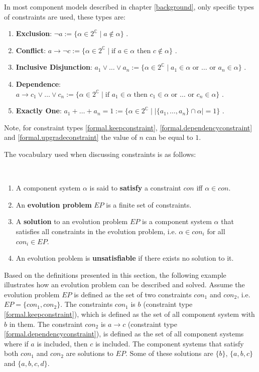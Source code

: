In most component models described in chapter \ref{background}, only specific types of constraints are used, these types are:
\begin{enumerate}
  \label{formal.constrainttypes}
  \item \textbf{Exclusion}: $\neg a := \{\alpha \in 2^{\mathbb{C}} \mid a \not \in \alpha \}$ \label{formal.removeconstraint}.
  \item \textbf{Conflict}: $a \rightarrow \neg c := \{\alpha \in 2^{\mathbb{C}} \mid \mbox{if } a \in \alpha \mbox{ then } c \not \in \alpha\}$ \label{formal.conflictconstraint}.
  \item \textbf{Inclusive Disjunction}: $a_1 \vee \ldots \vee a_n := \{\alpha \in 2^{\mathbb{C}} \mid a_1 \in \alpha \mbox{ or }\ldots \mbox{ or } a_n \in \alpha\}$ \label{formal.keepconstraint}.
  \item \textbf{Dependence}: $a \rightarrow c_1 \vee \ldots \vee c_n := \{\alpha \in 2^{\mathbb{C}} \mid \mbox{if } a_1 \in \alpha \mbox{ then }  c_1 \in \alpha \mbox{ or } \ldots \mbox{ or } c_n \in \alpha\}$ \label{formal.dependencyconstraint}.
  \item \textbf{Exactly One}: $a_1 + \ldots + a_n = 1 := \{\alpha \in 2^{\mathbb{C}} \mid |\{a_1,\ldots,a_n\} \cap \alpha| = 1\}$ \label{formal.upgradeconstraint}.
\end{enumerate}
Note, for constraint types \ref{formal.keepconstraint}, \ref{formal.dependencyconstraint} and \ref{formal.upgradeconstraint} the value of $n$ can be equal to $1$.

The vocabulary used when discussing constraints is as follows:
\begin{defs}
\label{formal.constraintdefs}
{\ }
\begin{enumerate}
  \item A component system $\alpha$ is said to \textbf{satisfy} a constraint $con$ iff $\alpha \in con$.
  \item An \textbf{evolution problem} $EP$ is a finite set of constraints.
  \item A \textbf{solution} to an evolution problem $EP$ is a component system  $\alpha$  that satisfies all constraints in the evolution problem, i.e. $\alpha \in con_i$ for all $con_i \in EP$.
  \item An evolution problem is \textbf{unsatisfiable} if there exists no solution to it.  
\end{enumerate}
\end{defs}

Based on the definitions presented in this section, the following example illustrates how an evolution problem can be described and solved.
Assume the evolution problem $EP$ is defined as the set of two constraints $con_1$ and $con_2$, i.e. $EP = \{con_1,con_2\}$.
The constraints $con_1$ is $b$ (constraint type \ref{formal.keepconstraint}), which is defined as the set of all component system with $b$ in them.
The constraint $con_2$ is $a \rightarrow c$ (constraint type \ref{formal.dependencyconstraint}), is defined as the set of all component systems where if $a$ is included, then $c$ is included.
The component systems that satisfy both $con_1$ and $con_2$ are solutions to $EP$.
Some of these solutions are $\{b\}$, $\{a,b,c\}$ and $\{a,b,c,d\}$.

